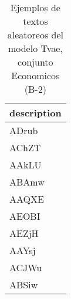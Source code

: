 \begin{table}[H]
\centering
\fontsize{8}{14}\selectfont
\caption{Ejemplos de textos aleatoreos del modelo Tvae, conjunto Economicos (B-2)}
\label{table-sample10-economicos-b-2-tvae-text}
\begin{tabular}{|m{50em}|}
\hline
\rowcolor[gray]{0.8}
description \\
\hline ADrub \\
\hline AChZT \\
\hline AAkLU \\
\hline ABAmw \\
\hline AAQXE \\
\hline AEOBI \\
\hline AEZjH \\
\hline AAYsj \\
\hline ACJWu \\
\hline ABSiw \\
\hline
\end{tabular}
\end{table}

